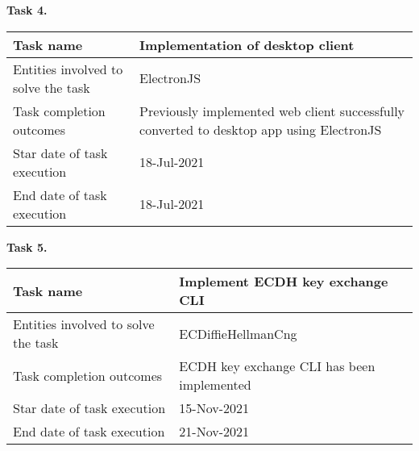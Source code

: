 \vskip 5mm
\textbf{Task 4.}\\
\begin{tabular}{|p{}|p{}|}
    \hline
    Task name                           & Implementation of desktop client \\
    \hline
    Entities involved to solve the task & ElectronJS                       \\
    \hline
    Task completion outcomes & Previously implemented web client successfully converted to
    desktop app using ElectronJS \\
    \hline
    Star date of task execution         & 18-Jul-2021                      \\
    \hline
    End date of task execution          & 18-Jul-2021                      \\
    \hline
\end{tabular}
\vskip 5mm
\textbf{Task 5.}\\
\begin{tabular}{|p{}|p{}|}
    \hline
    Task name                           & Implement ECDH key exchange CLI            \\
    \hline
    Entities involved to solve the task & ECDiffieHellmanCng                         \\
    \hline
    Task completion outcomes            & ECDH key exchange CLI has been implemented \\
    \hline
    Star date of task execution         & 15-Nov-2021                                \\
    \hline
    End date of task execution          & 21-Nov-2021                                \\
    \hline
\end{tabular}
